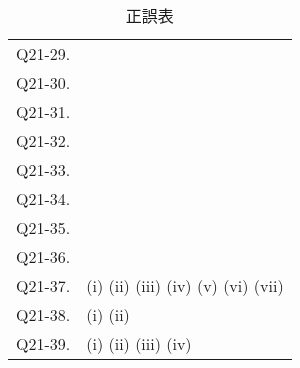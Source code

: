 \documentclass[uplatex,dvipdfmx,a4paper,11pt]{jlreq}
\numberwithin{equation}{section}
\theoremstyle{definition}
\begin{document}
\begin{table}[hbtp]
\begin{tabular}{ll}
    Q21-29. & \quad                                                                                                          \\
    Q21-30. & \quad                                                                                                          \\
    Q21-31. & \quad                                                                                                          \\
    Q21-32. & \quad                                                                                                          \\
    Q21-33. & \quad                                                                                                          \\
    Q21-34. & \quad                                                                                                          \\
    Q21-35. & \quad                                                                                                          \\
    Q21-36. & \quad                                                                                                          \\
    Q21-37. & (i) \quad (ii) \quad (iii) \quad (iv) \quad (v) \quad (vi) \quad (vii) \quad                                   \\
    Q21-38. & (i) \quad (ii) \quad                                                                                           \\
    Q21-39. & (i) \quad (ii) \quad (iii) \quad (iv) \quad                                                                    \\
    \hline
  \end{tabular}
  \caption{正誤表}
\end{table}
\end{document}
